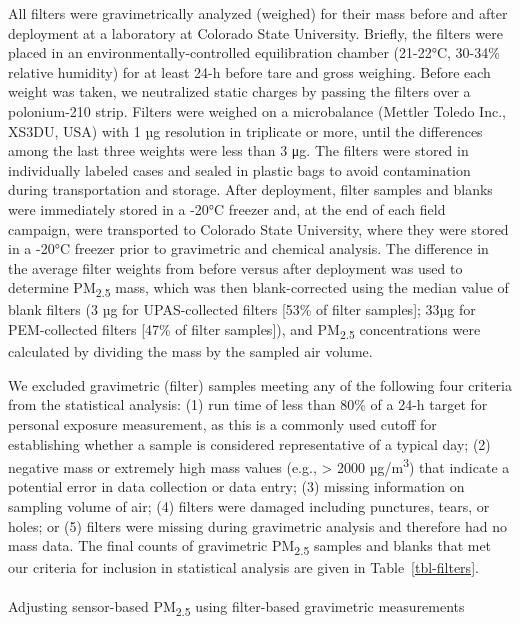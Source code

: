 \documentclass[
  letterpaper,
  DIV=11,
  numbers=noendperiod]{scrartcl}
\makeatletter
\let\oldparagraph\paragraph
\renewcommand{\paragraph}{
    \@ifstar
      \xxxParagraphStar
      \xxxParagraphNoStar
  }
\newcommand{\xxxParagraphStar}[1]{\oldparagraph*{#1}\mbox{}}
\newcommand{\xxxParagraphNoStar}[1]{\oldparagraph{#1}\mbox{}}
\makeatother
\begin{document}
All filters were gravimetrically analyzed (weighed) for their mass
before and after deployment at a laboratory at Colorado State
University. Briefly, the filters were placed in an
environmentally-controlled equilibration chamber (21-22°C, 30-34\%
relative humidity) for at least 24-h before tare and gross weighing.
Before each weight was taken, we neutralized static charges by passing
the filters over a polonium-210 strip. Filters were weighed on a
microbalance (Mettler Toledo Inc., XS3DU, USA) with 1 µg resolution in
triplicate or more, until the differences among the last three weights
were less than 3 μg. The filters were stored in individually labeled
cases and sealed in plastic bags to avoid contamination during
transportation and storage. After deployment, filter samples and blanks
were immediately stored in a -20°C freezer and, at the end of each field
campaign, were transported to Colorado State University, where they were
stored in a -20°C freezer prior to gravimetric and chemical analysis.
The difference in the average filter weights from before versus after
deployment was used to determine PM\textsubscript{2.5} mass, which was
then blank-corrected using the median value of blank filters (3 µg for
UPAS-collected filters {[}53\% of filter samples{]}; 33µg for
PEM-collected filters {[}47\% of filter samples{]}), and
PM\textsubscript{2.5} concentrations were calculated by dividing the
mass by the sampled air volume.

We excluded gravimetric (filter) samples meeting any of
the following four criteria from the statistical analysis: (1) run time
of less than 80\% of a 24-h target for personal exposure measurement, as
this is a commonly used cutoff for establishing whether a sample is
considered representative of a typical day; (2) negative mass or
extremely high mass values (e.g., \textgreater{} 2000
µg/m\textsuperscript{3}) that indicate a potential error in data
collection or data entry; (3) missing information on sampling volume of
air; (4) filters were damaged including punctures, tears, or holes; or
(5) filters were missing during gravimetric analysis and therefore had
no mass data. The final counts of gravimetric PM\textsubscript{2.5}
samples and blanks that met our criteria for inclusion in statistical
analysis are given in Table~\ref{tbl-filters}.

\paragraph{\texorpdfstring{Adjusting sensor-based PM\textsubscript{2.5}
using filter-based gravimetric
measurements}{Adjusting sensor-based PM2.5 using filter-based gravimetric measurements}}\label{adjusting-sensor-based-pm2.5-using-filter-based-gravimetric-measurements}
\end{document}
